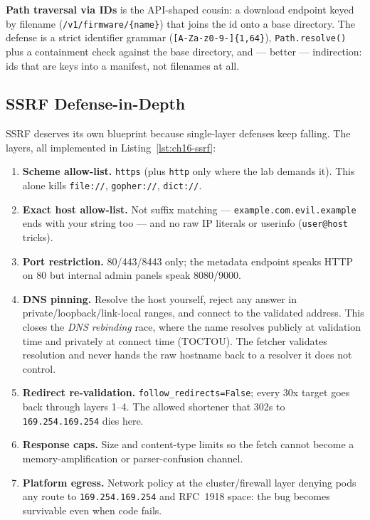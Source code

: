 \textbf{Path traversal via IDs} is the API-shaped cousin: a download
endpoint keyed by filename (\texttt{/v1/firmware/\{name\}}) that joins the
id onto a base directory. The defense is a strict identifier grammar
(\texttt{[A-Za-z0-9-]\{1,64\}}), \texttt{Path.resolve()} plus a
containment check against the base directory, and --- better ---
indirection: ids that are keys into a manifest, not filenames at all.

\subsection{SSRF Defense-in-Depth}
\label{sec:ch16-ssrf-defense}

SSRF deserves its own blueprint because single-layer defenses keep falling.
The layers, all implemented in Listing~\ref{lst:ch16-ssrf}:

\begin{enumerate}[itemsep=0.3em]
  \item \textbf{Scheme allow-list.} \texttt{https} (plus \texttt{http} only
        where the lab demands it). This alone kills \texttt{file://},
        \texttt{gopher://}, \texttt{dict://}.
  \item \textbf{Exact host allow-list.} Not suffix matching ---
        \texttt{example.com.evil.example} ends with your string too ---
        and no raw IP literals or userinfo (\texttt{user@host} tricks).
  \item \textbf{Port restriction.} 80/443/8443 only; the metadata endpoint
        speaks HTTP on 80 but internal admin panels speak 8080/9000.
  \item \textbf{DNS pinning.} Resolve the host yourself, reject any answer
        in private/loopback/link-local ranges, and connect to the validated
        address. This closes the \emph{DNS rebinding} race, where the name
        resolves publicly at validation time and privately at connect time
        (TOCTOU). The fetcher validates resolution and never hands the raw
        hostname back to a resolver it does not control.
  \item \textbf{Redirect re-validation.} \texttt{follow\_redirects=False};
        every 30x target goes back through layers 1--4. The allowed
        shortener that 302s to \texttt{169.254.169.254} dies here.
  \item \textbf{Response caps.} Size and content-type limits so the fetch
        cannot become a memory-amplification or parser-confusion channel.
  \item \textbf{Platform egress.} Network policy at the cluster/firewall
        layer denying pods any route to \texttt{169.254.169.254} and
        RFC~1918 space: the bug becomes survivable even when code fails.
\end{enumerate}

